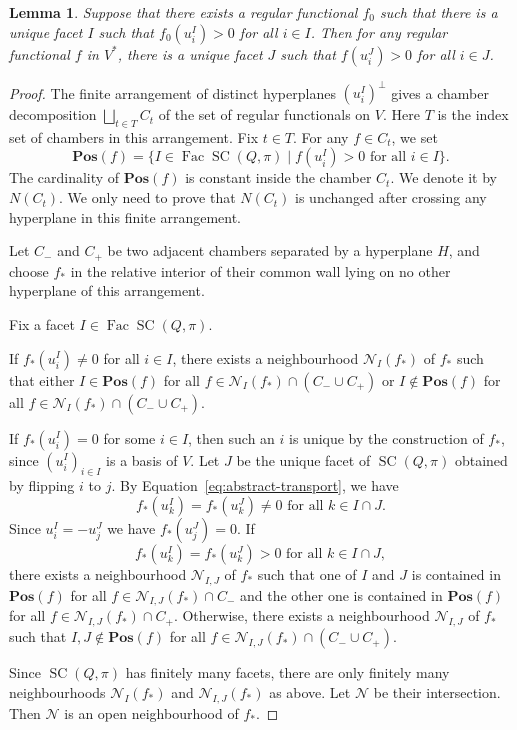 \documentclass[11pt,a4paper]{article}
\newtheorem{lemma}[theorem]{Lemma}
\theoremstyle{definition}
\theoremstyle{remark}
\newcommand{\SC}{\operatorname{SC}}
\newcommand{\Fac}{\operatorname{Fac}}
\numberwithin{equation}{section}
\begin{document}
\begin{lemma}\label{lem:regular-functional}
Suppose that there exists a regular functional $f_0$ such that there is a unique facet $I$ such that $f_0(u_i^I)>0$ for all $i\in I$.
Then for any regular functional $f$ in $V^*$, there is a unique facet $J$ such that $f(u_i^J)>0$ for all $i\in J$.
\end{lemma}

\begin{proof}
The finite arrangement of distinct hyperplanes $(u_i^I)^\perp$ gives a chamber decomposition $\bigsqcup_{t\in T} C_t$ of the set of regular functionals on $V$. Here $T$ is the index set of chambers in this arrangement. Fix $t\in T$. For any $f\in C_t$, we set  
\[ \mathbf{Pos}(f)= \{I\in \Fac\SC(Q,\pi) \mid f(u_i^I)>0 \text{ for all }i\in I\}.\]
The cardinality of $\mathbf{Pos}(f)$ is constant inside the chamber $C_t$. We denote it by $N(C_t)$. We only need to prove that $N(C_t)$ is unchanged after crossing any hyperplane in this finite arrangement.

Let $C_-$ and $C_+$ be two adjacent chambers separated by a hyperplane $H$, and choose $f_*$ in the relative interior of their common wall lying on no other hyperplane of this arrangement. 

Fix a facet $I\in \Fac\SC(Q,\pi)$.

If $f_*(u_i^I)\neq 0$ for all $i\in I$, there exists a neighbourhood $\mathcal N_I(f_*)$ of $f_*$ such that either $I\in \mathbf{Pos}(f)$ for all $f\in \mathcal N_I(f_*)\cap(C_-\cup C_+)$ or $I\notin \mathbf{Pos}(f)$ for all $f\in \mathcal N_I(f_*)\cap(C_-\cup C_+)$. 

If $f_*(u_i^I)=0$ for some $i\in I$, then such an $i$ is unique by the construction of $f_*$, since
$(u_i^I)_{i\in I}$ is a basis of $V$. Let $J$ be the unique facet of $\SC(Q,\pi)$ obtained by flipping $i$ to $j$. By Equation~\ref{eq:abstract-transport}, we have
\[
f_*(u_k^I)=f_*(u_k^J)\neq 0 \text{ for all } k\in I\cap J.
\]
Since $u^I_i=-u^J_j$ we have $f_*(u_j^J)=0$. If 
\[
f_*(u_k^I)=f_*(u_k^J)> 0 \text{ for all } k\in I\cap J,
\]
there exists a neighbourhood $\mathcal N_{I,J}$ of $f_*$ such that one of $I$ and $J$ is contained in $\mathbf{Pos}(f)$ for all $f\in \mathcal N_{I,J}(f_*)\cap C_-$ and the other one is contained in $\mathbf{Pos}(f)$ for all $f\in \mathcal N_{I,J}(f_*)\cap C_+$. Otherwise, there exists a neighbourhood $\mathcal N_{I,J}$ of $f_*$ such that $I,J\notin \mathbf{Pos}(f)$ for all $f\in \mathcal N_{I,J}(f_*)\cap(C_-\cup C_+)$.

Since $\SC(Q,\pi)$ has finitely many facets, there are only finitely many neighbourhoods $\mathcal N_I(f_*)$ and $\mathcal N_{I,J}(f_*)$
as above. Let $\mathcal N$ be their intersection. Then $\mathcal N$ is an open neighbourhood of $f_*$.


\end{proof}
\end{document}
